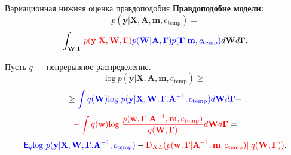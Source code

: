 \documentclass[usenames,dvipsnames,11pt,pdf,utf8,russian,aspectratio=169]{beamer}
\begin{document}
                                                                                                                                       
                                                                                                                                    

\begin{frame}{Вариационная нижняя оценка правдоподобия}     
\textbf{Правдоподобие модели:}
\[
p(\mathbf{y}|\mathbf{X},\mathbf{A},\mathbf{m}, c_{\text{temp}}) =
\]
\[
 \int_{\mathbf{W}, \boldsymbol{\Gamma} } \textcolor{red}{p(\mathbf{y}|\mathbf{X},\mathbf{W},  \boldsymbol{\Gamma})} \textcolor{blue}{p(\mathbf{W}|\mathbf{A}, \boldsymbol{\Gamma})p(\boldsymbol{\Gamma}|\mathbf{m}, c_{\text{temp}})} d\mathbf{W}d{\boldsymbol{\Gamma}}.                         
\]

Пусть $q$ --- непрерывное распределение.
$$                                                                                                                                              
        \text{log}~p(\mathbf{y}|\mathbf{X},\mathbf{A},\mathbf{m}, c_{\text{temp}}) \geq 
$$          
$$                                                                                                                                              
         \geq  \textcolor{blue}{\int q(\mathbf{W})\text{log}~{p(\mathbf{y} | \mathbf{X}, \mathbf{W}, \boldsymbol{\Gamma}. \mathbf{A}^{-1}, c_{\text{temp}})}d \mathbf{W}d\boldsymbol{\Gamma}} -$$ 
    $$  \textcolor{red}{-\int q(\mathbf{w})\text{log}~\frac{p(\mathbf{w}, \boldsymbol{\Gamma} |\mathbf{A}^{-1}, \mathbf{m}, c_{\text{temp}})}{q(\mathbf{W}, \boldsymbol{\Gamma})}d\mathbf{W}d\boldsymbol{\Gamma}} =$$
$$
\textcolor{blue}{\mathsf{E}_q \text{log}~{p(\mathbf{y} | \mathbf{X}, \mathbf{W}, \boldsymbol{\Gamma}. \mathbf{A}^{-1}, c_{\text{temp}})}} - \textcolor{red}{\text{D}_{KL}(p(\mathbf{w}, \boldsymbol{\Gamma} |\mathbf{A}^{-1}, \mathbf{m}, c_{\text{temp}}) || q(\mathbf{W}, \boldsymbol{\Gamma}))}.
$$ 

\end{frame}      
   
\end{document}
